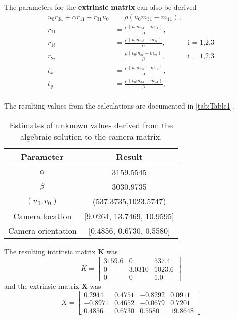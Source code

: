 \documentclass[12pt]{report}
\begin{document}
\begin{enumerate}
\begin{enumerate}
    The parameters for the \textbf{extrinsic matrix} can also be derived
    \begin{align*}
    u_0 r_{31} + \alpha r_{11} - r_{31} u_0 & = \rho (u_0 m_{31} - m_{11}), \\
    r_{11} & = \frac {\rho (u_0 m_{31} - m_{11})}{\alpha}, & {}\\
    r_{1i} & = \frac {\rho (u_0 m_{3i} - m_{1i})}{\alpha}, & \text{i = 1,2,3}\\
    r_{2i} & = \frac {\rho (v_0 m_{3i} - m_{2i})}{\beta}, & \text{i = 1,2,3}\\
    t_{x} & = \frac {\rho (u_0 m_{34} - m_{14})}{\alpha}, & {}\\
    t_{y} & = \frac {\rho (v_0 m_{34} - m_{24})}{\beta}, & {}\\
    \end{align*}

    The resulting values from the calculations are documented in \autoref{tab:Table1}.
    \begin{table}[h!]
    \begin{center}
    \begin{tabular}{ ||c | c|| } 
        \hline
        Parameter & Result \\ 
        \hline \hline
        $\alpha$ & 3159.5545 \\ 
        $\beta$  & 3030.9735 \\ 
        $(u_0,v_0)$ & (537.3735,1023.5747) \\ 
        Camera location & [9.0264, 13.7469, 10.9595] \\ 
        Camera orientation & [0.4856, 0.6730, 0.5580] \\
        \hline
    \end{tabular}
    \caption{Estimates of unknown values derived from the algebraic solution to the camera matrix.}
    \label{tab:Table1}
    \end{center}
    \end{table}
    The resulting intrinsic matrix $\mathbf{K}$ was 
    $$
    K = \begin{bmatrix}
    3159.6 & 0 & 537.4 \\
        0 & 3.0310 & 1023.6 \\
        0 & 0 & 1.0
    \end{bmatrix}
    $$
    and the extrinsic matrix $\mathbf{X}$ was
    $$
    X = \begin{bmatrix}
    0.2944 & 0.4751 & -0.8292 & 0.0911 \\
    -0.8971 & 0.4652 & -0.0679 & 0.7201 \\
    0.4856 & 0.6730 & 0.5580 & 19.8648
    \end{bmatrix}
    $$


\end{enumerate}
\end{enumerate}
\end{document}
